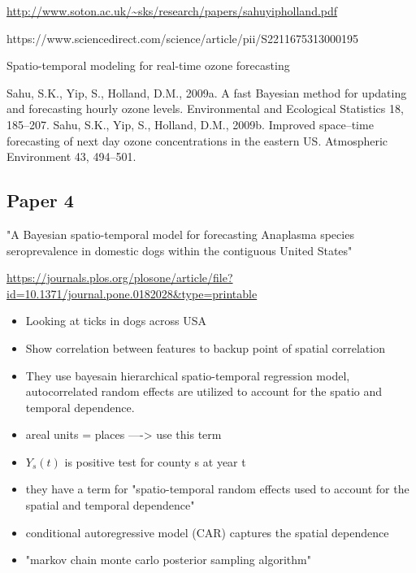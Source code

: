\url{http://www.soton.ac.uk/~sks/research/papers/sahuyipholland.pdf}


 

https://www.sciencedirect.com/science/article/pii/S2211675313000195

Spatio-temporal modeling for real-time ozone forecasting



Sahu, S.K., Yip, S., Holland, D.M., 2009a. A fast Bayesian method for updating and forecasting hourly ozone levels. Environmental 
and Ecological Statistics 18, 185–207.
Sahu, S.K., Yip, S., Holland, D.M., 2009b. Improved space–time forecasting of next day ozone concentrations in the eastern US. 
Atmospheric Environment 43, 494–501.




\subsection{Paper 4}

"A Bayesian spatio-temporal model for forecasting Anaplasma species seroprevalence in domestic dogs within the contiguous United States"

\url{https://journals.plos.org/plosone/article/file?id=10.1371/journal.pone.0182028&type=printable}

\begin{itemize}




    \item Looking at ticks in dogs across USA
    \item Show correlation between features to backup point of spatial correlation
    \item They use bayesain hierarchical spatio-temporal regression model, autocorrelated random effects are utilized to account for the spatio and temporal dependence.
    \item areal units =  places ----> use this term
    \item $Y_s(t)$ is positive test for county s at year t
    \item they have a term for "spatio-temporal random effects used to account for the spatial and temporal dependence"
    \item conditional autoregressive model (CAR) captures the spatial dependence
    \item "markov chain monte carlo posterior sampling algorithm"
    
    
    
    
    
\end{itemize}


